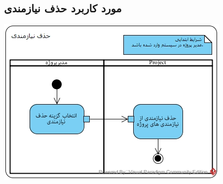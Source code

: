 \subsection*{مورد کاربرد حذف نیازمندی}
\vspace{2cm}
\begin{center}
\includegraphics[width=\textwidth]{ActivityDiagramsWithSwimlanes/25.jpg}
\end{center}

\newpage
\vspace{2cm}
